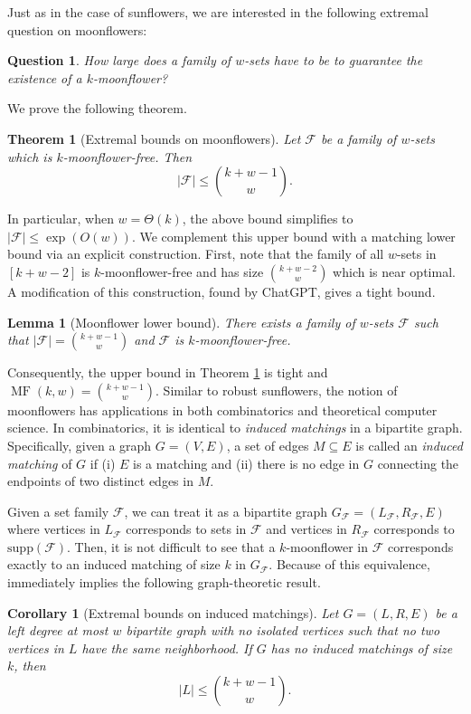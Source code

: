 \documentclass{article}
\newtheorem{theorem}{Theorem}[section]
\newtheorem{lemma}[lemma]{Lemma}
\newtheorem{corollary}[corollary]{Corollary}
\newtheorem{question}[question]{Question}
\DeclareMathOperator{\MF}{MF}
\newcommand{\<}{\langle}
\renewcommand{\>}{\rangle}
\newcommand{\calF}{\mathcal{F}}
\newcommand{\supp}{\mathrm{supp}}
\begin{document}
Just as in the case of sunflowers, we are interested in the following extremal question on moonflowers: 

\begin{question}\label{q:wsfext}
    How large does a family of $w$-sets have to be to guarantee the existence of a $k$-moonflower?
\end{question}
We prove the following theorem.

\begin{theorem}[Extremal bounds on moonflowers]\label{main_wsf_theorem}  Let $\calF$ be a family of $w$-sets which is $k$-moonflower-free. Then 
\[
|\calF| \leq \binom{k+w-1}{w}.
\]
\end{theorem}

In particular, when $w = \Theta (k)$, the above bound simplifies to $|\calF| \leq \exp (O(w))$. We complement this upper bound with a matching lower bound via an explicit construction. First, note that the family of all $w$-sets in $[k+w-2]$ is $k$-moonflower-free and has size ${k+w-2 \choose w}$ which is near optimal. A modification of this construction, found by ChatGPT, gives a tight bound.

\begin{lemma}[Moonflower lower bound]\label{wsf_lower_bound}
    There exists a family of $w$-sets $\calF$ such that $|\calF| = \binom{k+w-1}{w}$ and $\calF$ is $k$-moonflower-free.
\end{lemma}
Consequently, the upper bound in Theorem \ref{main_wsf_theorem} is tight and $\MF(k,w)={k+w-1 \choose w}$. Similar to robust sunflowers, the notion of moonflowers has applications in both combinatorics and theoretical computer science. In combinatorics, it is identical to  \emph{induced matchings} in a bipartite graph. Specifically, given a graph $G = (V, E)$, a set of edges $M \subseteq E$ is called an \emph{induced matching} of $G$ if (i) $E$ is a matching and (ii) there is no edge in $G$ connecting the endpoints of two distinct edges in $M$.

Given a set family $\calF$, we can treat it as a bipartite graph $G_{\calF} = (L_{\calF}, R_{\calF}, E)$ where vertices in $L_{\calF}$ corresponds to sets in $\calF$ and vertices in $R_{\calF}$ corresponds to $\supp (\calF)$. Then, it is not difficult to see that a $k$-moonflower in $\calF$ corresponds exactly to an induced matching of size $k$ in $G_{\calF}$. Because of this equivalence,  immediately implies the following graph-theoretic result.

\begin{corollary}[Extremal bounds on induced matchings]
     Let $G = (L, R, E)$ be a left degree at most $w$ bipartite graph with no isolated vertices such that no two vertices in $L$ have the same neighborhood. If $G$ has no induced matchings of size $k$, then
    \[
   |L| \leq \binom{k+w-1}{w}.
    \]
\end{corollary}
\end{document}
